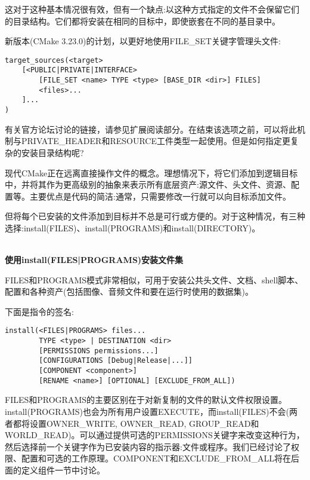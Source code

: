 这对于这种基本情况很有效，但有一个缺点:以这种方式指定的文件不会保留它们的目录结构。它们都将安装在相同的目标中，即使嵌套在不同的基目录中。

新版本(CMake 3.23.0)的计划，以更好地使用FILE\_SET关键字管理头文件:

\begin{lstlisting}[style=styleCMake]
target_sources(<target>
	[<PUBLIC|PRIVATE|INTERFACE>
		[FILE_SET <name> TYPE <type> [BASE_DIR <dir>] FILES]
		<files>...
	]...
)
\end{lstlisting}

有关官方论坛讨论的链接，请参见扩展阅读部分。在结束该选项之前，可以将此机制与PRIVATE\_HEADER和RESOURCE工件类型一起使用。但是如何指定更复杂的安装目录结构呢?


现代CMake正在远离直接操作文件的概念。理想情况下，将它们添加到逻辑目标中，并将其作为更高级别的抽象来表示所有底层资产:源文件、头文件、资源、配置等。主要优点是代码的简洁:通常，只需要修改一行就可以向目标添加文件。

但将每个已安装的文件添加到目标并不总是可行或方便的。对于这种情况，有三种选择:install(FILES)、install(PROGRAMS)和install(DIRECTORY)。

\hspace*{\fill} \\ %
\noindent
\textbf{使用install(FILES|PROGRAMS)安装文件集}

FILES和PROGRAMS模式非常相似，可用于安装公共头文件、文档、shell脚本、配置和各种资产(包括图像、音频文件和要在运行时使用的数据集)。

下面是指令的签名:

\begin{lstlisting}[style=styleCMake]
install(<FILES|PROGRAMS> files...
		TYPE <type> | DESTINATION <dir>
		[PERMISSIONS permissions...]
		[CONFIGURATIONS [Debug|Release|...]]
		[COMPONENT <component>]
		[RENAME <name>] [OPTIONAL] [EXCLUDE_FROM_ALL])
\end{lstlisting}

FILES和PROGRAMS的主要区别在于对新复制的文件的默认文件权限设置。install(PROGRAMS)也会为所有用户设置EXECUTE，而install(FILES)不会(两者都将设置OWNER\_WRITE, OWNER\_READ, GROUP\_READ和WORLD\_READ)。可以通过提供可选的PERMISSIONS关键字来改变这种行为，然后选择前一个关键字作为已安装内容的指示器:文件或程序。我们已经讨论了权限、配置和可选的工作原理。COMPONENT和EXCLUDE\_FROM\_ALL将在后面的定义组件一节中讨论。

